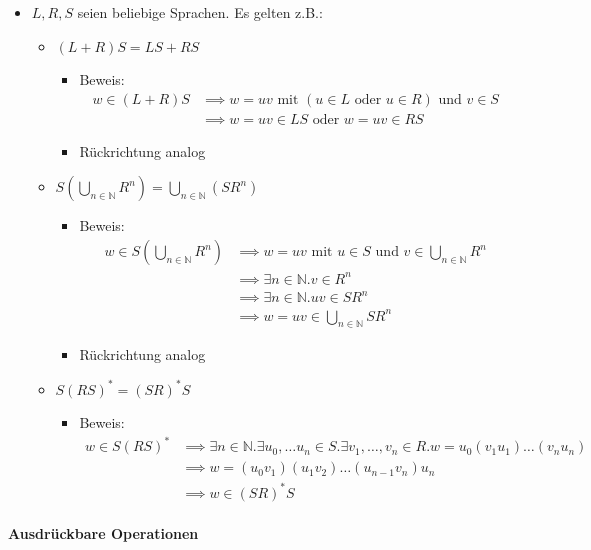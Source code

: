 \documentclass{scrartcl}
\begin{document}
\begin{itemize}
	\item $L,R,S$ seien beliebige Sprachen. Es gelten z.B.:
	\begin{itemize}
		\item $(L + R)S = LS +RS$
		\begin{itemize}
			\item Beweis:
			\begin{align*}
				w \in (L + R)S &\implies w = uv \text{ mit } (u \in L \text{ oder } u \in R) \text{ und } v \in S \\
				&\implies w = uv \in LS \text{ oder } w = uv \in RS
			\end{align*}
			\item Rückrichtung analog
		\end{itemize}
		\item $S(\bigcup_{n \in \mathbb{N}}R^n) = \bigcup_{n \in \mathbb{N}}(SR^n)$
		\begin{itemize}
			\item Beweis:
			\begin{align*}
				w \in S(\bigcup_{n \in \mathbb{N}}R^n) &\implies w = uv \text{ mit } u \in S \text{ und } v \in \bigcup_{n \in \mathbb{N}}R^n \\
				&\implies \exists n \in \mathbb{N}. v \in R^n \\
				& \implies \exists n \in \mathbb{N}. uv \in SR^n \\
				&\implies w = uv \in \bigcup_{n \in \mathbb{N}}SR^n
			\end{align*}
			\item Rückrichtung analog
		\end{itemize}
		\item $S(RS)^* = (SR)^*S$
		\begin{itemize}
			\item Beweis:
			\begin{align*}
				w \in S(RS)^* &\implies \exists n \in \mathbb{N}. \exists u_0, \ldots u_n \in S. \exists v_1, \ldots, v_n \in R. w = u_0(v_1u_1) \ldots (v_nu_n) \\
				&\implies w = (u_0v_1)(u_1v_2) \ldots (u_{n-1}v_n)u_n \\
				&\implies w \in (SR)^*S
			\end{align*}
		\end{itemize}
	\end{itemize}
\end{itemize}

\paragraph{Ausdrückbare Operationen}
\end{document}
